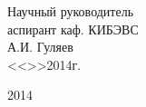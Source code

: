 \vfill

\begin{flushright}
\begin{minipage}{0.45\textwidth}
 \begin{flushleft}
  Научный руководитель \\
  аспирант каф. КИБЭВС \\
  \underline{\hspace{3cm}}А.И. Гуляев \\
  <<\underline{\hspace{1cm}}>>\underline{\hspace{3cm}}2014г.\\
 \end{flushleft}
\end{minipage}
\end{flushright}

\vfill

\begin{center}
 2014
\end{center}